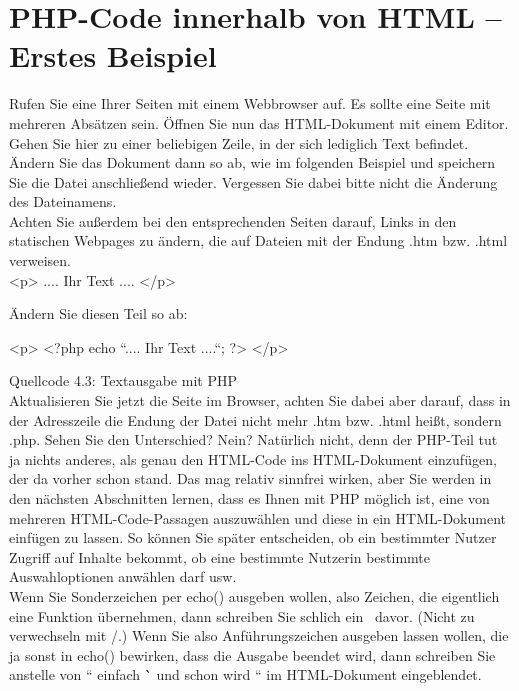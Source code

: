 \section{PHP-Code innerhalb von HTML – Erstes Beispiel}

Rufen Sie eine Ihrer Seiten mit einem Webbrowser auf. Es sollte eine Seite mit mehreren Absätzen sein. Öffnen Sie nun das HTML-Dokument mit einem Editor. Gehen Sie hier zu einer beliebigen Zeile, in der sich lediglich Text befindet. Ändern Sie das Dokument dann so ab, wie im folgenden Beispiel und speichern Sie die Datei anschließend wieder. Vergessen Sie dabei bitte nicht die Änderung des Dateinamens. \\

Achten Sie außerdem bei den entsprechenden Seiten darauf, Links in den statischen Webpages zu ändern, die auf Dateien mit der Endung .htm bzw. .html verweisen.\\

<p>
.... Ihr Text ....
</p>

Ändern Sie diesen Teil so ab:

<p>
<?php echo ``.... Ihr Text ....``; ?>
</p>

Quellcode 4.3: Textausgabe mit PHP\\

Aktualisieren Sie jetzt die Seite im Browser, achten Sie dabei aber darauf, dass in der Adresszeile die Endung der Datei nicht mehr .htm bzw. .html heißt, sondern .php. Sehen Sie den Unterschied? Nein? Natürlich nicht, denn der PHP-Teil  tut ja nichts anderes, als genau den HTML-Code ins HTML-Dokument einzufügen, der da vorher schon stand. Das mag relativ sinnfrei wirken, aber Sie werden in den nächsten Abschnitten lernen, dass es Ihnen mit PHP möglich ist, eine von mehreren HTML-Code-Passagen auszuwählen und diese in ein HTML-Dokument einfügen zu lassen. So können Sie später entscheiden, ob ein bestimmter Nutzer Zugriff auf Inhalte bekommt, ob eine bestimmte Nutzerin bestimmte Auswahloptionen anwählen darf usw.\\

Wenn Sie Sonderzeichen per echo() ausgeben wollen, also Zeichen, die eigentlich eine Funktion übernehmen, dann schreiben Sie schlich ein \ davor. (Nicht zu verwechseln mit /.) Wenn Sie also Anführungszeichen ausgeben lassen wollen, die ja sonst in echo() bewirken, dass die Ausgabe beendet wird, dann schreiben Sie anstelle von `` einfach \`` und schon wird `` im HTML-Dokument eingeblendet.\\

